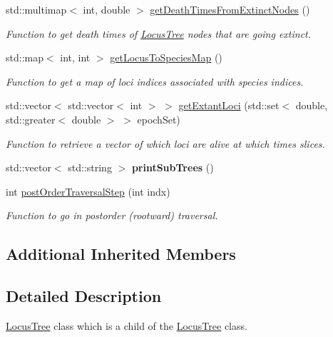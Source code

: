 \begin{DoxyCompactItemize}
std\+::multimap$<$ int, double $>$ \mbox{\hyperlink{class_locus_tree_abb55c1a342d51d1c9c14ded1ec956b7d}{get\+Death\+Times\+From\+Extinct\+Nodes}} ()
\begin{DoxyCompactList}\small\item\em Function to get death times of \mbox{\hyperlink{class_locus_tree}{Locus\+Tree}} nodes that are going extinct. \end{DoxyCompactList}\item 
std\+::map$<$ int, int $>$ \mbox{\hyperlink{class_locus_tree_a33f60a30325b66eb6953e909517980a4}{get\+Locus\+To\+Species\+Map}} ()
\begin{DoxyCompactList}\small\item\em Function to get a map of loci indices associated with species indices. \end{DoxyCompactList}\item 
std\+::vector$<$ std\+::vector$<$ int $>$ $>$ \mbox{\hyperlink{class_locus_tree_a73bb95535ffc07ef6c8ad5978a0b2a06}{get\+Extant\+Loci}} (std\+::set$<$ double, std\+::greater$<$ double $>$ $>$ epoch\+Set)
\begin{DoxyCompactList}\small\item\em Function to retrieve a vector of which loci are alive at which times slices. \end{DoxyCompactList}\item 
\mbox{\label{class_locus_tree_a3386627735dce363c53bee66ed91e8d4}} 
std\+::vector$<$ std\+::string $>$ {\bfseries print\+Sub\+Trees} ()
\item 
int \mbox{\hyperlink{class_locus_tree_a612c899bfa5f06b2277f7032bca394d2}{post\+Order\+Traversal\+Step}} (int indx)
\begin{DoxyCompactList}\small\item\em Function to go in postorder (rootward) traversal. \end{DoxyCompactList}\end{DoxyCompactItemize}
\subsection*{Additional Inherited Members}


\subsection{Detailed Description}
\mbox{\hyperlink{class_locus_tree}{Locus\+Tree}} class which is a child of the \mbox{\hyperlink{class_locus_tree}{Locus\+Tree}} class. 


